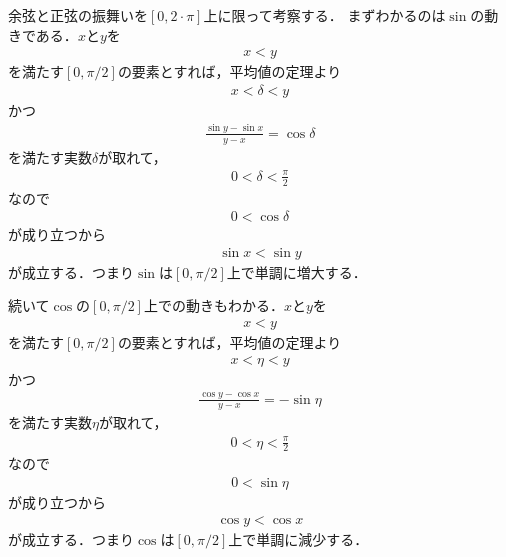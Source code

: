 	余弦と正弦の振舞いを$[0,2 \cdot \pi]$上に限って考察する．
	まずわかるのは$\sin$の動きである．$x$と$y$を
	\begin{align}
		x < y
	\end{align}
	を満たす$[0,\pi/2]$の要素とすれば，平均値の定理より
	\begin{align}
		x < \delta < y
	\end{align}
	かつ
	\begin{align}
		\frac{\sin{y} - \sin{x}}{y - x} = \cos{\delta}
	\end{align}
	を満たす実数$\delta$が取れて，
	\begin{align}
		0 < \delta < \frac{\pi}{2}
	\end{align}
	なので
	\begin{align}
		0 < \cos{\delta}
	\end{align}
	が成り立つから
	\begin{align}
		\sin{x} < \sin{y}
	\end{align}
	が成立する．つまり$\sin$は$[0,\pi/2]$上で単調に増大する．
	
	\begin{center}
	\end{center}
	
	続いて$\cos$の$[0,\pi/2]$上での動きもわかる．$x$と$y$を
	\begin{align}
		x < y
	\end{align}
	を満たす$[0,\pi/2]$の要素とすれば，平均値の定理より
	\begin{align}
		x < \eta < y
	\end{align}
	かつ
	\begin{align}
		\frac{\cos{y} - \cos{x}}{y - x} = -\sin{\eta}
	\end{align}
	を満たす実数$\eta$が取れて，
	\begin{align}
		0 < \eta < \frac{\pi}{2}
	\end{align}
	なので
	\begin{align}
		0 < \sin{\eta}
	\end{align}
	が成り立つから
	\begin{align}
		\cos{y} < \cos{x}
	\end{align}
	が成立する．つまり$\cos$は$[0,\pi/2]$上で単調に減少する．
	

